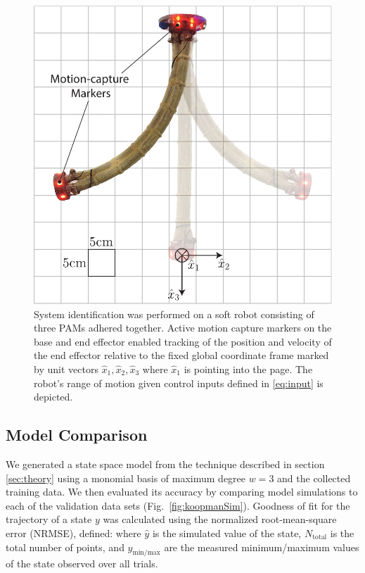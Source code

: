 \begin{figure}
    \centering
    \vspace{10pt}
    \includegraphics[width=0.8\linewidth]{figures/flaccyDiagram_bothways_v4.pdf}
    \caption{System identification was performed on a soft robot consisting of three PAMs adhered together. 
        Active motion capture markers on the base and end effector enabled tracking of the position and velocity of the end effector relative to the fixed global coordinate frame marked by unit vectors $\hat{x}_1,\hat{x}_2,\hat{x}_3$ where $\hat{x}_1$ is pointing into the page. The robot's range of motion given control inputs defined in \eqref{eq:input} is depicted.}
    \label{fig:flaccy}
\end{figure}


\subsection{Model Comparison}
\label{sec:modelcomparison}

We generated a state space model from the technique described in section \ref{sec:theory} using a monomial basis of maximum degree $w=3$ and the collected training data.
We then evaluated its accuracy by comparing model simulations to each of the validation data sets (Fig.~\ref{fig:koopmanSim}).
Goodness of fit for the trajectory of a state $y$ was calculated using the normalized root-mean-square error (NRMSE), defined:
where $\hat{y}$ is the simulated value of the state, $N_\text{total}$ is the total number of points, and $y_{\text{min/max}}$ are the measured minimum/maximum values of the state observed over all trials.

